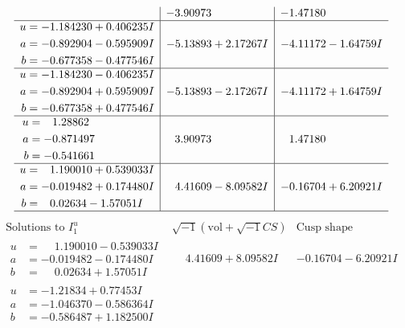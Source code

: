 \documentclass[1p]{elsarticle_modified}
\theoremstyle{definition}
\newcommand{\I}{\sqrt{-1}}
\begin{document}
$$\begin{array}{c|c|c}
 & -3.90973\phantom{ +0.000000I} & -1.47180\phantom{ +0.000000I} \\ \hline\begin{aligned}
u &= -1.184230 + 0.406235 I \\
a &= -0.892904 - 0.595909 I \\
b &= -0.677358 - 0.477546 I\end{aligned}
 & -5.13893 + 2.17267 I & -4.11172 - 1.64759 I \\ \hline\begin{aligned}
u &= -1.184230 - 0.406235 I \\
a &= -0.892904 + 0.595909 I \\
b &= -0.677358 + 0.477546 I\end{aligned}
 & -5.13893 - 2.17267 I & -4.11172 + 1.64759 I \\ \hline\begin{aligned}
u &= \phantom{-}1.28862\phantom{ +0.000000I} \\
a &= -0.871497\phantom{ +0.000000I} \\
b &= -0.541661\phantom{ +0.000000I}\end{aligned}
 & \phantom{-}3.90973\phantom{ +0.000000I} & \phantom{-}1.47180\phantom{ +0.000000I} \\ \hline\begin{aligned}
u &= \phantom{-}1.190010 + 0.539033 I \\
a &= -0.019482 + 0.174480 I \\
b &= \phantom{-}0.02634 - 1.57051 I\end{aligned}
 & \phantom{-}4.41609 - 8.09582 I & -0.16704 + 6.20921 I\\
 \hline 
 \end{array}$$\newpage$$\begin{array}{c|c|c}  
\text{Solutions to }I^u_{1}& \I (\text{vol} + \sqrt{-1}CS) & \text{Cusp shape}\\
 \hline 
\begin{aligned}
u &= \phantom{-}1.190010 - 0.539033 I \\
a &= -0.019482 - 0.174480 I \\
b &= \phantom{-}0.02634 + 1.57051 I\end{aligned}
 & \phantom{-}4.41609 + 8.09582 I & -0.16704 - 6.20921 I \\ \hline\begin{aligned}
u &= -1.21834 + 0.77453 I \\
a &= -1.046370 - 0.586364 I \\
b &= -0.586487 + 1.182500 I\end{aligned}

\end{array}$$
\end{document}
